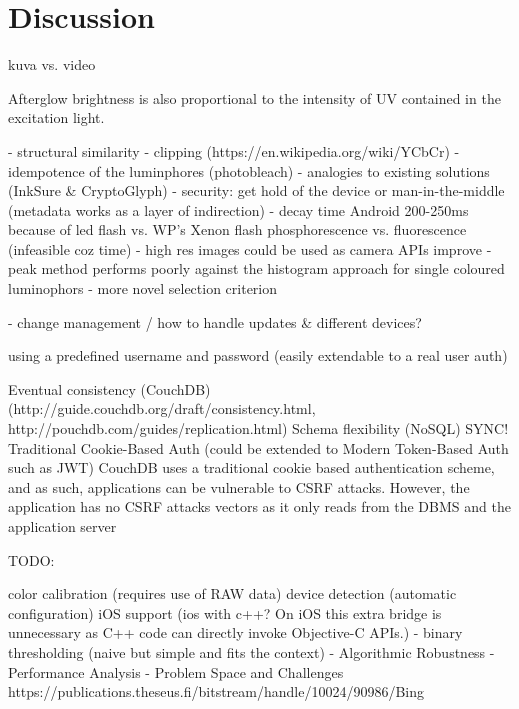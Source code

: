 \documentclass[thesis.tex]{subfiles}
\begin{document}
\chapter{Discussion}
\label{chapter:discussion}
kuva vs. video

Afterglow brightness is also proportional to the intensity of UV contained in the excitation light.

- structural similarity
- clipping (https://en.wikipedia.org/wiki/YCbCr)
- idempotence of the luminphores (photobleach)
- analogies to existing solutions (InkSure \& CryptoGlyph)
- security: get hold of the device or man-in-the-middle (metadata works as a layer of indirection)
- decay time Android 200-250ms because of led flash vs. WP's Xenon flash
phosphorescence vs. fluorescence (infeasible coz time)
- high res images could be used as camera APIs improve
- peak method performs poorly against the histogram approach for single coloured luminophors
- more novel selection criterion

- change management / how to handle updates \& different devices?

using a predefined username and password (easily extendable to a real user auth)

Eventual consistency (CouchDB) (http://guide.couchdb.org/draft/consistency.html, http://pouchdb.com/guides/replication.html)
Schema flexibility (NoSQL) SYNC!
Traditional Cookie-Based Auth (could be extended to Modern Token-Based Auth such as JWT)
CouchDB uses a traditional cookie based authentication scheme, and as such, applications can be vulnerable to CSRF attacks. However, the application has no CSRF attacks vectors as it only reads from the DBMS and the application server

TODO:

color calibration (requires use of RAW data)
device detection (automatic configuration)
iOS support (ios with c++? On iOS this extra bridge is unnecessary as C++ code can directly invoke Objective-C APIs.)
- binary thresholding (naive but simple and fits the context)
- Algorithmic Robustness
- Performance Analysis
- Problem Space and Challenges
https://publications.theseus.fi/bitstream/handle/10024/90986/Bing%


\end{document}
